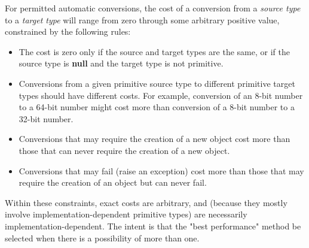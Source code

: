 For permitted automatic conversions, the cost of a conversion from a
\emph{source type} to a \emph{target type} will range from zero
through some arbitrary positive value, constrained by the following
rules:
\begin{itemize}
\item The cost is zero only if the source and target types are the same,
or if the source type is \textbf{null} and the target type is not
primitive.
\item 
Conversions from a given primitive source type to different primitive
target types should have different costs.
For example, conversion of an 8-bit number to a 64-bit number might cost
more than conversion of a 8-bit number to a 32-bit number.
\item 
Conversions that may require the creation of a new object cost more than
those that can never require the creation of a new object.
\item 
Conversions that may fail (raise an exception) cost more than those
that may require the creation of an object but can never fail.
\end{itemize}
 
Within these constraints, exact costs are arbitrary, and (because they
mostly involve implementation-dependent primitive types) are necessarily
implementation-dependent.
The intent is that the "best performance" method be selected when
there is a possibility of more than one.
